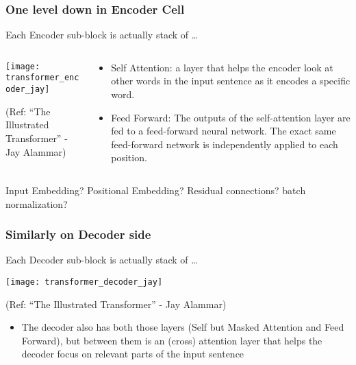 \begin{frame}[fragile]\frametitle{One level down in Encoder Cell}

Each Encoder sub-block is actually stack of \ldots

\begin{columns}
    \begin{column}[T]{0.5\linewidth}
		\begin{center}
		\texttt{[image: transformer\_encoder\_jay]}
		
		{\tiny (Ref: ``The Illustrated Transformer'' - Jay Alammar)}
		\end{center}		
	\end{column}
	\begin{column}[T]{0.5\linewidth}
		\begin{itemize}
		\item Self Attention:  a layer that helps the encoder look at other words in the input sentence as it encodes a specific word.
		\item Feed Forward: The outputs of the self-attention layer are fed to a feed-forward neural network. The exact same feed-forward network is independently applied to each position.
		\end{itemize}
	\end{column}
\end{columns}
Input Embedding? Positional Embedding? Residual connections? batch normalization?
			
\end{frame}


\begin{frame}[fragile]\frametitle{Similarly on Decoder side}

Each Decoder sub-block is actually stack of \ldots


		\begin{center}
		\texttt{[image: transformer\_decoder\_jay]}
		
		{\tiny (Ref: ``The Illustrated Transformer'' - Jay Alammar)}

		\end{center}		
		

		\begin{itemize}
		\item The decoder also has both those layers (Self but Masked Attention and Feed Forward), but between them is an (cross) attention layer that helps the decoder focus on relevant parts of the input sentence
		\end{itemize}

		
\end{frame}

